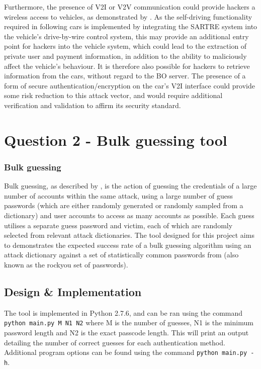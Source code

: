 \documentclass[british,11pt,a4paper]{article}
\begin{document}
Furthermore, the presence of V2I or V2V communication could provide hackers a wireless access to vehicles, as demonstrated by \citet{Curri2015-zo}. As the self-driving functionality required in following cars is implemented by integrating the SARTRE system into the vehicle’s drive-by-wire control system, this may provide an additional entry point for hackers into the vehicle system, which could lead to the extraction of private user and payment information, in addition to the ability to maliciously affect the vehicle’s behaviour. It is therefore also possible for hackers to retrieve information from the cars, without regard to the BO server. The presence of a form of secure authentication/encryption on the car’s V2I interface could provide some risk reduction to this attack vector, and would require additional verification and validation to affirm its security standard.

\clearpage

\section{Question 2 - Bulk guessing tool}

\subsubsection{Bulk guessing}
Bulk guessing, as described by \citet{Florencio2007-yp}, is the action of guessing the credentials of a large number of accounts within the same attack, using a large number of guess passwords (which are either randomly generated or randomly sampled from a dictionary) and user accounts to access as many accounts as possible. Each guess utilises a separate guess password and victim, each of which are randomly selected from relevant attack dictionaries. The tool designed for this project aims to demonstrates the expected success rate of a bulk guessing algorithm using an attack dictionary against a set of statistically common passwords from \citet{Cubrilovic2009-wu} (also known as the rockyou set of passwords).

\subsection{Design \& Implementation}
The tool is implemented in Python 2.7.6, and can be ran using the command \lstinline{python main.py M N1 N2} where M is the number of guesses, N1 is the minimum password length and N2 is the exact passcode length. This will print an output detailing the number of correct guesses for each authentication method. Additional program options can be found using the command \lstinline{python main.py -h}. 
\end{document}
